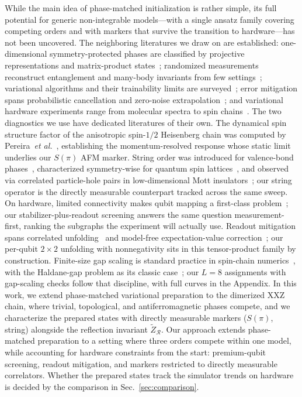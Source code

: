 While the main idea of phase-matched initialization is rather simple,
its full potential for generic non-integrable models---with a single
ansatz family covering competing orders and with markers that survive
the transition to hardware---has not been uncovered.
The neighboring literatures we draw on are
established: one-dimensional symmetry-protected phases are classified by
projective representations and matrix-product
states~\cite{chen2011classification,schuch2011classifying};
randomized measurements reconstruct entanglement and many-body
invariants from few
settings~\cite{huang2020predicting,elben2022toolbox};
variational algorithms and their trainability limits are
surveyed~\cite{cerezo2021variational,tilly2022variational,mcclean2018barren};
error mitigation spans probabilistic cancellation and zero-noise
extrapolation~\cite{temme2017error,kandala2019error}; and variational
hardware experiments range from molecular spectra to spin
chains~\cite{colless2018robust,yu2023simulating}.
The two diagnostics we use have dedicated literatures of their own.
The dynamical spin structure factor of the anisotropic spin-$1/2$
Heisenberg chain was computed by Pereira~\textit{et
al.}~\cite{pereira2006dynamical}, establishing the momentum-resolved
response whose static limit underlies our $S(\pi)$ AFM marker.
String order was introduced for valence-bond
phases~\cite{dennijs1989preroughening}, characterized symmetry-wise for
quantum spin lattices~\cite{perezgarcia2008string}, and observed via
correlated particle-hole pairs in low-dimensional Mott
insulators~\cite{endres2011observation}; our string operator is the
directly measurable counterpart tracked across the same sweep.
On hardware, limited connectivity makes qubit mapping a first-class
problem~\cite{li2019tackling}; our stabilizer-plus-readout screening
answers the same question measurement-first, ranking the subgraphs the
experiment will actually use. Readout mitigation spans correlated
unfolding~\cite{bravyi2021mitigating,nation2021scalable} and model-free
expectation-value correction~\cite{vandenberg2022modelfree}; our
per-qubit $2\times2$ unfolding with nonnegativity sits in this
tensor-product family by construction. Finite-size gap scaling is
standard practice in spin-chain
numerics~\cite{sandvik2010computational}, with the Haldane-gap problem
as its classic case~\cite{haldane1983nonlinear,affleck1987rigorous,affleck1989quantum};
our $L=8$ assignments with gap-scaling checks follow that discipline,
with full curves in the Appendix.
In this work, we extend phase-matched variational preparation to the
dimerized XXZ chain, where trivial, topological, and antiferromagnetic
phases compete, and we characterize the prepared states with directly
measurable markers ($S(\pi)$, string) alongside the
reflection invariant $\tilde{Z}_{\mathcal R}$.
Our approach extends phase-matched preparation to a setting where three
orders compete within one model, while accounting for hardware
constraints from the start: premium-qubit screening, readout mitigation,
and markers restricted to directly measurable correlators.
Whether the prepared states track the simulator trends on hardware is
decided by the comparison in Sec.~\ref{sec:comparison}.

